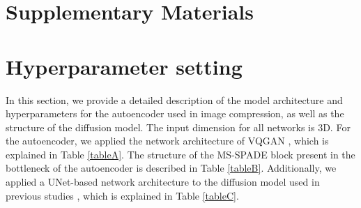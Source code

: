 \clearpage
\setcounter{page}{1}
\setcounter{table}{0}
\setcounter{figure}{0}
\section*{Supplementary Materials}

\appendix

\renewcommand{\thesection}{\Alph{section}}
\renewcommand{\thefigure}{\Alph{figure}}
\renewcommand{\thetable}{\Alph{table}}

\section{Hyperparameter setting}

In this section, we provide a detailed description of the model architecture and hyperparameters for the autoencoder used in image compression, as well as the structure of the diffusion model. The input dimension for all networks is 3D. For the autoencoder, we applied the network architecture of VQGAN \cite{esser2021taming}, which is explained in Table \ref{tableA}. The structure of the MS-SPADE block present in the bottleneck of the autoencoder is described in Table \ref{tableB}. Additionally, we applied a UNet-based network architecture to the diffusion model used in previous studies \cite{ho2020denoising, rombach2022high}, which is explained in Table \ref{tableC}.

\begin{table}[h]
    \centering
    \vspace{-6pt}
    \caption{Detailed Hyperparameters for latent diffusion model.} 
    \vspace{-9pt}
    \label{tableA}
\end{table}

